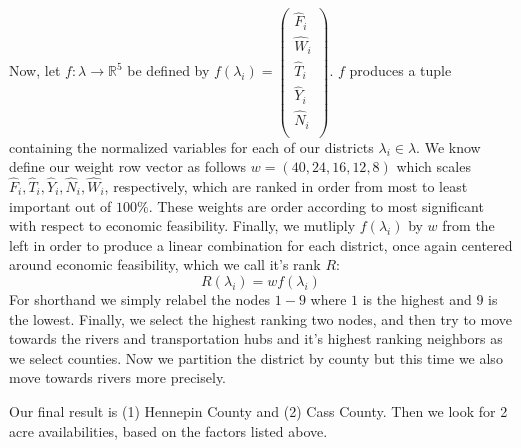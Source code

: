\documentclass[addpoints,10pt]{exam}
\theoremstyle{plain}
\theoremstyle{definition}
\theoremstyle{plain}
\theoremstyle{plain}
\theoremstyle{definition}
\newcommand{\RR}{\ensuremath{\mathbb{R}}}
\begin{document}
Now, let $f:\lambda\rightarrow \RR^{5}$ be defined by $f(\lambda_{i})=\begin{pmatrix}
  \hat{F}_{i}\\
  \hat{W}_{i}\\
  \hat{T}_{i}\\
  \hat{Y}_{i}\\
  \hat{N}_{i}\\
\end{pmatrix}$. $f$ produces a tuple containing the normalized variables for each of our districts $\lambda_{i}\in \lambda$. We know define our weight row vector as follows $w=(40,24,16,12,8)$ which scales $\hat{F}_{i}, \hat{T}_{i}, \hat{Y}_{i}, \hat{N}_{i}, \hat{W}_{i}$, respectively, which are ranked in order from most to least important out of $100\%$. These weights are order according to most significant with respect to economic feasibility. Finally, we mutliply $f(\lambda_{i})$ by $w$ from the left in order to produce a linear combination for each district, once again centered around economic feasibility, which we call it's rank $R$:
$$R(\lambda_{i})=wf(\lambda_{i})$$
For shorthand we simply relabel the nodes $1-9$ where $1$ is the highest and $9$ is the lowest. Finally, we select the highest ranking two nodes, and then try to move towards the rivers and transportation hubs and it's highest ranking neighbors as we select counties. Now we partition the district by county but this time we also move towards rivers more precisely. 

Our final result is (1) Hennepin County and (2) Cass County. Then we look for 2 acre availabilities, based on the factors listed above.
\end{document}
